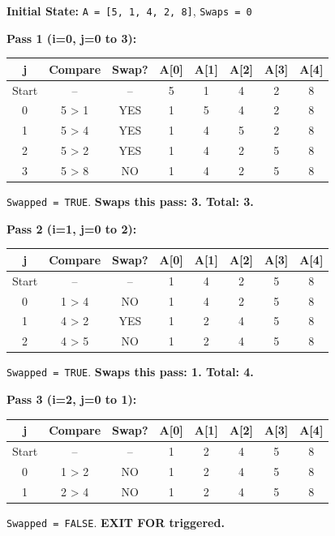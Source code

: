 \documentclass[11pt]{article}
\begin{document}
\begin{exoresolu}
\noindent\textbf{Initial State:} \texttt{A = [5, 1, 4, 2, 8]}, \texttt{Swaps = 0}

\noindent\textbf{Pass 1 (i=0, j=0 to 3):}
\begin{center}
\begin{tabular}{|c|c|c|c|c|c|c|c|}\hline
\rowcolor{popblueL}
\textbf{j} & \textbf{Compare} & \textbf{Swap?} & \textbf{A[0]} & \textbf{A[1]} & \textbf{A[2]} & \textbf{A[3]} & \textbf{A[4]} \\ \hline
Start & -- & -- & 5 & 1 & 4 & 2 & 8 \\ \hline
0 & 5 > 1 & YES & 1 & 5 & 4 & 2 & 8 \\ \hline
1 & 5 > 4 & YES & 1 & 4 & 5 & 2 & 8 \\ \hline
2 & 5 > 2 & YES & 1 & 4 & 2 & 5 & 8 \\ \hline
3 & 5 > 8 & NO & 1 & 4 & 2 & 5 & 8 \\ \hline
\end{tabular}
\end{center}
\texttt{Swapped = TRUE}. \textbf{Swaps this pass: 3. Total: 3.}

\noindent\textbf{Pass 2 (i=1, j=0 to 2):}
\begin{center}
\begin{tabular}{|c|c|c|c|c|c|c|c|}\hline
\rowcolor{popblueL}
\textbf{j} & \textbf{Compare} & \textbf{Swap?} & \textbf{A[0]} & \textbf{A[1]} & \textbf{A[2]} & \textbf{A[3]} & \textbf{A[4]} \\ \hline
Start & -- & -- & 1 & 4 & 2 & 5 & 8 \\ \hline
0 & 1 > 4 & NO & 1 & 4 & 2 & 5 & 8 \\ \hline
1 & 4 > 2 & YES & 1 & 2 & 4 & 5 & 8 \\ \hline
2 & 4 > 5 & NO & 1 & 2 & 4 & 5 & 8 \\ \hline
\end{tabular}
\end{center}
\texttt{Swapped = TRUE}. \textbf{Swaps this pass: 1. Total: 4.}

\noindent\textbf{Pass 3 (i=2, j=0 to 1):}
\begin{center}
\begin{tabular}{|c|c|c|c|c|c|c|c|}\hline
\rowcolor{popblueL}
\textbf{j} & \textbf{Compare} & \textbf{Swap?} & \textbf{A[0]} & \textbf{A[1]} & \textbf{A[2]} & \textbf{A[3]} & \textbf{A[4]} \\ \hline
Start & -- & -- & 1 & 2 & 4 & 5 & 8 \\ \hline
0 & 1 > 2 & NO & 1 & 2 & 4 & 5 & 8 \\ \hline
1 & 2 > 4 & NO & 1 & 2 & 4 & 5 & 8 \\ \hline
\end{tabular}
\end{center}
\texttt{Swapped = FALSE}. \textbf{EXIT FOR triggered.}


\end{exoresolu}
\end{document}
